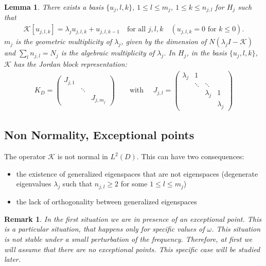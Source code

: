 \documentclass[11pt]{article}
\numberwithin{equation}{section}
\newtheorem{remark}{Remark}[section]
\newtheorem{lemma}{Lemma}[section]
\begin{document}
\begin{lemma}There exists a basis $\{u_j,l,k\}$, $1\leq l \leq m_j$, $1\leq k \leq n_{j,l}$ for $H_j$ such that 
\begin{align*}
\mathcal{K}[u_{j,l,k}]= \lambda_j u_{j,l,k }+u_{j,l,k-1} \quad \text{for \ all\ } j,l,k \quad (u_{j,l,k}=0 \text{\ for \ } k\leq 0).
\end{align*}
$m_j$ is the geometric multiplicity of $\lambda_j$, given by the dimension of $N(\lambda_j I - \mathcal{K})$ and $\sum_l n_{j,l}= N_j$ is the algebraic multiplicity of $\lambda_j$.
In $H_j$, in the basis $\{u_j,l,k\}$, $\mathcal{K}$ has the Jordan block representation:
\begin{align*}
K_D= \begin{pmatrix}
J_{j,1} & \ &\ \\
 & \ddots & \\
 &  & J_{j,m_j} 
\end{pmatrix} \qquad \text{with } \quad J_{j,l}= \begin{pmatrix}
\lambda_j & 1 & & \\
 & \ddots & \ddots & \\
 &         &  \lambda_j & 1 \\
 &          &           & \lambda_j
\end{pmatrix}
\end{align*}

 \end{lemma}
 
\subsection{Non Normality, Exceptional points}
The operator $\mathcal{K}$ is not normal in $L^2(D)$.
This can have two consequences:
\begin{itemize}
\item the existence of generalized eigenspaces that are not eigenspaces (degenerate eigenvalues $\lambda_j$ such that  $n_{j,l}\geq 2$ for some $1\leq l \leq m_j$)
\item the lack of orthogonality between generalized eigenspaces
\end{itemize}

\begin{remark}
In the first situation we are in presence of an \emph{exceptional point}. This is a particular situation, that happens only for specific values of $\omega$. This situation is not stable under a small perturbation of the frequency. Therefore, at first we will assume that there are no exceptional points. This specific case will be studied later.
\end{remark}
\end{document}
